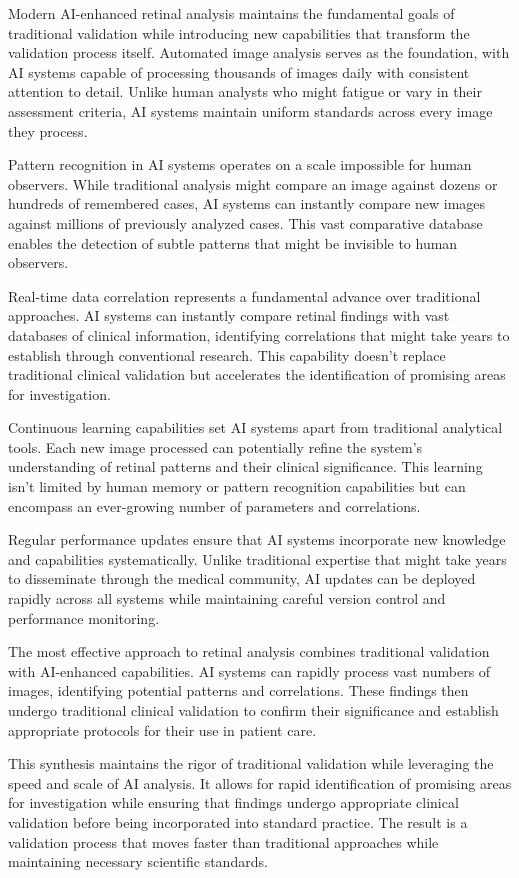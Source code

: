 \documentclass[
  Letterpaper,
]{scrbook}
\begin{document}
Modern AI-enhanced retinal analysis maintains the fundamental goals of
traditional validation while introducing new capabilities that transform
the validation process itself. Automated image analysis serves as the
foundation, with AI systems capable of processing thousands of images
daily with consistent attention to detail. Unlike human analysts who
might fatigue or vary in their assessment criteria, AI systems maintain
uniform standards across every image they process.

Pattern recognition in AI systems operates on a scale impossible for
human observers. While traditional analysis might compare an image
against dozens or hundreds of remembered cases, AI systems can instantly
compare new images against millions of previously analyzed cases. This
vast comparative database enables the detection of subtle patterns that
might be invisible to human observers.

Real-time data correlation represents a fundamental advance over
traditional approaches. AI systems can instantly compare retinal
findings with vast databases of clinical information, identifying
correlations that might take years to establish through conventional
research. This capability doesn't replace traditional clinical
validation but accelerates the identification of promising areas for
investigation.

Continuous learning capabilities set AI systems apart from traditional
analytical tools. Each new image processed can potentially refine the
system's understanding of retinal patterns and their clinical
significance. This learning isn't limited by human memory or pattern
recognition capabilities but can encompass an ever-growing number of
parameters and correlations.

Regular performance updates ensure that AI systems incorporate new
knowledge and capabilities systematically. Unlike traditional expertise
that might take years to disseminate through the medical community, AI
updates can be deployed rapidly across all systems while maintaining
careful version control and performance monitoring.

The most effective approach to retinal analysis combines traditional
validation with AI-enhanced capabilities. AI systems can rapidly process
vast numbers of images, identifying potential patterns and correlations.
These findings then undergo traditional clinical validation to confirm
their significance and establish appropriate protocols for their use in
patient care.

This synthesis maintains the rigor of traditional validation while
leveraging the speed and scale of AI analysis. It allows for rapid
identification of promising areas for investigation while ensuring that
findings undergo appropriate clinical validation before being
incorporated into standard practice. The result is a validation process
that moves faster than traditional approaches while maintaining
necessary scientific standards.
\end{document}
